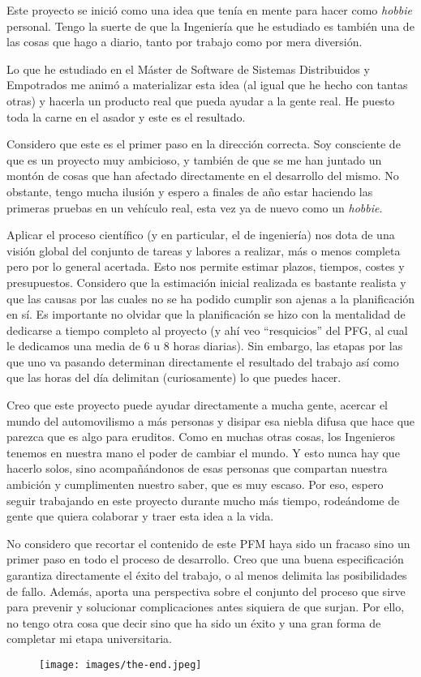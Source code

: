 Este proyecto se inició como una idea que tenía en mente para
hacer como \textit{hobbie} personal. Tengo la suerte de que
la Ingeniería que he estudiado es también una de las cosas que
hago a diario, tanto por trabajo como por mera diversión.

Lo que he estudiado en el Máster de Software de Sistemas Distribuidos y
Empotrados me animó a materializar esta idea (al igual que he hecho con
tantas otras) y hacerla un producto real que pueda ayudar a la gente
real. He puesto toda la carne en el asador y este es el resultado.

Considero que este es el primer paso en la dirección correcta. Soy
consciente de que es un proyecto muy ambicioso, y también de que
se me han juntado un montón de cosas que han afectado directamente
en el desarrollo del mismo. No obstante, tengo mucha ilusión y
espero a finales de año estar haciendo las primeras pruebas en
un vehículo real, esta vez ya de nuevo como un \textit{hobbie}.

Aplicar el proceso científico (y en particular, el de ingeniería)
nos dota de una visión global del conjunto de tareas y labores
a realizar, más o menos completa pero por lo general acertada. Esto
nos permite estimar plazos, tiempos, costes y presupuestos. Considero
que la estimación inicial realizada es bastante realista y que
las causas por las cuales no se ha podido cumplir son ajenas a la
planificación en sí. Es importante no olvidar que la planificación
se hizo con la mentalidad de dedicarse a tiempo completo al proyecto
(y ahí veo ``resquicios'' del PFG, al cual le dedicamos una media de
6 u 8 horas diarias). Sin embargo, las etapas por las que uno va
pasando determinan directamente el resultado del trabajo así como
que las horas del día delimitan (curiosamente) lo que puedes hacer.

Creo que este proyecto puede ayudar directamente a mucha gente,
acercar el mundo del automovilismo a más personas y disipar esa
niebla difusa que hace que parezca que es algo para eruditos.
Como en muchas otras cosas, los Ingenieros tenemos en nuestra
mano el poder de cambiar el mundo. Y esto nunca hay que hacerlo
solos, sino acompañándonos de esas personas que compartan nuestra
ambición y cumplimenten nuestro saber, que es muy escaso. Por eso,
espero seguir trabajando en este proyecto durante mucho más tiempo,
rodeándome de gente que quiera colaborar y traer esta idea a la
vida.

No considero que recortar el contenido de este PFM haya sido un fracaso sino
un primer paso en todo el proceso de desarrollo. Creo que una buena
especificación garantiza directamente el éxito del trabajo, o al
menos delimita las posibilidades de fallo. Además, aporta una perspectiva
sobre el conjunto del proceso que sirve para prevenir y solucionar
complicaciones antes siquiera de que surjan. Por ello, no tengo otra
cosa que decir sino que ha sido un éxito y una gran forma de completar
mi etapa universitaria.

\begin{figure}[H]
  \centering
  \texttt{[image: images/the-end.jpeg]}
\end{figure}
